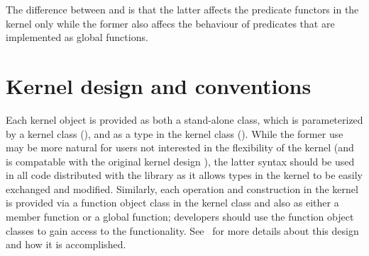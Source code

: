 The difference between  and
 is that the latter affects the predicate
functors in the kernel only while the former also affecs the behaviour
of predicates that are implemented as global functions.

\section{Kernel design and conventions}
%
%
Each kernel object is provided as both a stand-alone class, which is 
parameterized by a kernel class (), and as a type 
in the kernel class ().  While the former use may
be more natural for users not interested in the flexibility of the kernel
(and is compatable with the original kernel design \cite{fgkss-dccga-00}), the
latter syntax should be used in all code distributed with the library
as it allows types in the kernel to be easily exchanged and modified.
Similarly, each operation and construction in the kernel is provided via 
a function object class in the 
kernel class and also as either a member function or a global function; 
developers should use the function object classes to gain access to the
functionality.  See~\cite{hhkps-aegk-01} for more details about this 
design and how it is accomplished.

